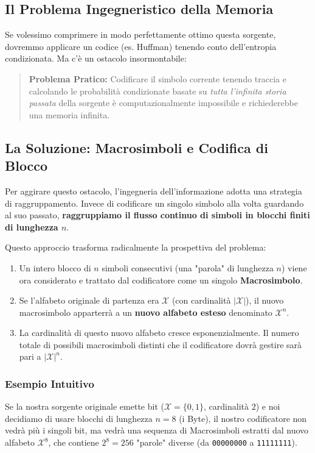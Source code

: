 \subsection{Il Problema Ingegneristico della Memoria}

Se volessimo comprimere in modo perfettamente ottimo questa sorgente, dovremmo applicare un codice (es. Huffman) tenendo conto dell'entropia condizionata. Ma c'è un ostacolo insormontabile:
\begin{quote}
    \textbf{Problema Pratico:} Codificare il simbolo corrente tenendo traccia e calcolando le probabilità condizionate basate su \textit{tutta l'infinita storia passata} della sorgente è computazionalmente impossibile e richiederebbe una memoria infinita.
\end{quote}

\subsection{La Soluzione: Macrosimboli e Codifica di Blocco}

Per aggirare questo ostacolo, l'ingegneria dell'informazione adotta una strategia di raggruppamento. Invece di codificare un singolo simbolo alla volta guardando al suo passato, \textbf{raggruppiamo il flusso continuo di simboli in blocchi finiti di lunghezza $n$}.

Questo approccio trasforma radicalmente la prospettiva del problema:
\begin{enumerate}
    \item Un intero blocco di $n$ simboli consecutivi (una "parola" di lunghezza $n$) viene ora considerato e trattato dal codificatore come un singolo \textbf{Macrosimbolo}.
    \item Se l'alfabeto originale di partenza era $\mathcal{X}$ (con cardinalità $|\mathcal{X}|$), il nuovo macrosimbolo apparterrà a un \textbf{nuovo alfabeto esteso} denominato $\mathcal{X}^n$.
    \item La cardinalità di questo nuovo alfabeto cresce esponenzialmente. Il numero totale di possibili macrosimboli distinti che il codificatore dovrà gestire sarà pari a $|\mathcal{X}|^n$.
\end{enumerate}

\subsubsection*{Esempio Intuitivo}
Se la nostra sorgente originale emette bit ($\mathcal{X} = \{0, 1\}$, cardinalità $2$) e noi decidiamo di usare blocchi di lunghezza $n=8$ (i Byte), il nostro codificatore non vedrà più i singoli bit, ma vedrà una sequenza di Macrosimboli estratti dal nuovo alfabeto $\mathcal{X}^8$, che contiene $2^8 = 256$ "parole" diverse (da \texttt{00000000} a \texttt{11111111}).

